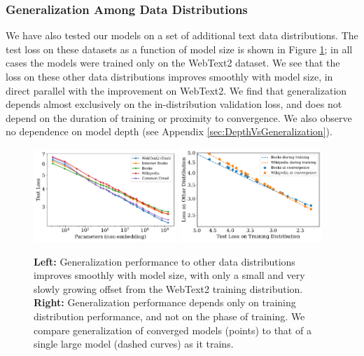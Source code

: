 \documentclass[english]{article}
\begin{document}
\subsubsection{Generalization Among Data Distributions}
\label{sec:GeneralizationtoOtherDistributions}


We have also tested our models on a set of additional text data distributions.  The test loss on these datasets as a function of model size is shown in Figure \ref{fig:GeneralizationVsModelSize}; in all cases the models were trained only on the WebText2 dataset.  We see that the loss on these other data distributions improves smoothly with model size, in direct parallel with the improvement on WebText2.  We find that generalization depends almost exclusively on the in-distribution validation loss, and does not depend on the duration of training or proximity to convergence. We also observe no dependence on model depth (see Appendix \ref{sec:DepthVsGeneralization}).

\begin{figure}
\noindent \centering{} \includegraphics[width=0.48\textwidth]{GeneralizationVsModelSize}\hfill
\noindent \centering{} \includegraphics[width=0.48\textwidth]{TrainingVsConvergence}
\caption[Generalization to other test datasets]{
\textbf{Left:} Generalization performance to other data distributions improves smoothly with model size, with only a small and very slowly growing offset from the WebText2 training distribution.
\textbf{Right:} Generalization performance depends only on training distribution performance, and not on the phase of training.  We compare generalization of converged models (points) to that of a single large model (dashed curves) as it trains.
\label{fig:GeneralizationVsModelSize}}
\end{figure}
\end{document}
